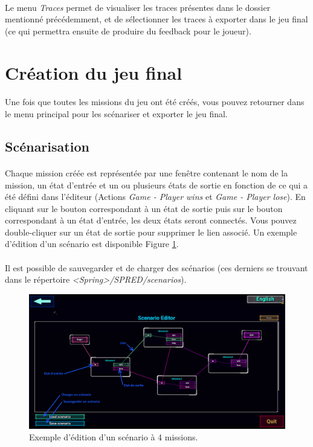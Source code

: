 \documentclass[a4paper]{article}
\begin{document}
\paragraph{ }
Le menu \textit{Traces} permet de visualiser les traces présentes dans le dossier mentionné précédemment, et de sélectionner les traces à exporter dans le jeu final (ce qui permettra ensuite de produire du feedback pour le joueur).
\section{Création du jeu final}
\paragraph{ }
Une fois que toutes les missions du jeu ont été créés, vous pouvez retourner dans le menu principal pour les scénariser et exporter le jeu final.
\subsection{Scénarisation}\label{scenario-editor}
\paragraph{ }
Chaque mission créée est représentée par une fenêtre contenant le nom de la mission, un état d'entrée et un ou plusieurs états de sortie en fonction de ce qui a été défini dans l'éditeur (Actions \textit{Game - Player wins} et \textit{Game - Player lose}). En cliquant sur le bouton correspondant à un état de sortie puis sur le bouton correspondant à un état d'entrée, les deux états seront connectés. Vous pouvez double-cliquer sur un état de sortie pour supprimer le lien associé. Un exemple d'édition d'un scénario est disponible Figure \ref{fig:launcher-scenario}.
\paragraph{ }
Il est possible de sauvegarder et de charger des scénarios (ces derniers se trouvant dans le répertoire \textit{<Spring>/SPRED/scenarios}).
\begin{figure}[H]
\centering
\includegraphics[width=\linewidth]{launcher-scenario.png}
\caption{Exemple d'édition d'un scénario à 4 missions.}
\label{fig:launcher-scenario}
\end{figure}
\end{document}
